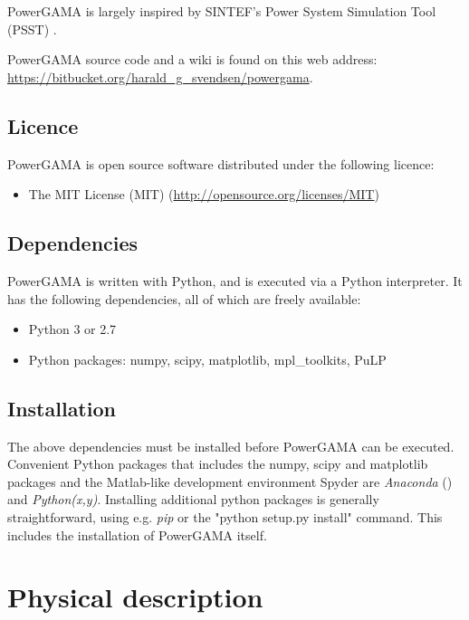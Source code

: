 \documentclass{article}
\begin{document}
PowerGAMA is largely inspired by SINTEF's Power System Simulation Tool (PSST) 
\cite{korpas2007,hueartas2010}.

\bigskip\noindent
PowerGAMA source code and a wiki is found on this web address:
\\ 
\url{https://bitbucket.org/harald_g_svendsen/powergama}.

\subsection{Licence}
PowerGAMA is open source software distributed under the following licence:
\begin{itemize}
\item The MIT License (MIT) (\url{http://opensource.org/licenses/MIT})
\end{itemize}

\subsection{Dependencies}
PowerGAMA is written with Python, and is executed via a Python interpreter.
It has the following dependencies, all of which are freely available:

\begin{itemize}
\item Python 3 or 2.7
\item Python packages: numpy, scipy, matplotlib, mpl\_toolkits, PuLP
\end{itemize}

\subsection{Installation}

The above dependencies must be installed before PowerGAMA can be executed. Convenient Python packages that includes the numpy, scipy and matplotlib packages and the Matlab-like development environment Spyder are \emph{Anaconda} () and \emph{Python(x,y)}.
%
Installing additional python packages is generally straightforward, using e.g. \emph{pip} or the "python setup.py install" command. This includes the installation of PowerGAMA itself.




\section{Physical description}
\end{document}
